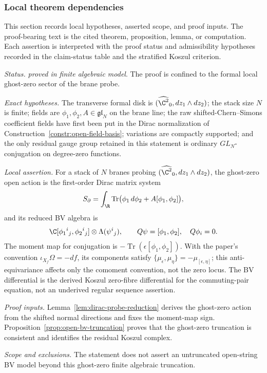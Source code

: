 \subsubsection{Local theorem dependencies}\label{ssec:theorem-lanes}
This section records local hypotheses, asserted scope, and
proof inputs.  The proof-bearing text is the cited theorem,
proposition, lemma, or computation.  Each assertion is interpreted with
the proof status and admissibility hypotheses recorded in the claim-status table
and the stratified Koszul criterion.

\begin{stmt}\label{thm:lane-dirac-probe}
  \emph{Status.} \emph{proved in finite algebraic model}.  The proof is
  confined to the formal local ghost-zero sector of the brane probe.

  \emph{Exact hypotheses.} The transverse formal disk is
  \((\widehat{\C^2}_0,dz_1\wedge dz_2)\); the stack size \(N\) is finite;
  fields are \(\phi_1,\phi_2,A\in\mathfrak{gl}_N\) on the brane line;
  the raw shifted-Chern--Simons coefficient fields have first been put in
  the Dirac normalization of
  Construction~\ref{constr:open-field-basis}; variations are compactly
  supported; and the only residual gauge group retained in this statement is
  ordinary \(GL_N\)-conjugation on degree-zero functions.

  \emph{Local assertion.} For a stack of \(N\) branes probing
  \((\widehat{\C^2}_0,dz_1\wedge dz_2)\), the ghost-zero open action is
  the first-order Dirac matrix system
  \[
    S_\partial
    =\int_\R\operatorname{Tr}
      \bigl(\phi_1\,d\phi_2+A[\phi_1,\phi_2]\bigr),
  \]
  and its reduced BV algebra is
  \[
    \C[\phi_1{}^i{}_j,\phi_2{}^i{}_j]\otimes
    \Lambda(\psi^i{}_j),
    \qquad
    Q\psi=[\phi_1,\phi_2],\quad Q\phi_i=0.
  \]
  The moment map for conjugation is
  \(-\operatorname{Tr}(\epsilon[\phi_1,\phi_2])\).  With the paper's
  convention \(\iota_{X_f}\Omega=-df\), its components satisfy
  \(\{\mu_\epsilon,\mu_\eta\}=-\mu_{[\epsilon,\eta]}\); this
  anti-equivariance affects only the comoment convention, not the zero
  locus.  The BV differential is the derived Koszul zero-fibre
  differential for the commuting-pair equation, not an underived regular
  sequence assertion.

  \emph{Proof inputs.}
  Lemma~\ref{lem:dirac-probe-reduction} derives the ghost-zero action
  from the shifted normal directions and fixes the moment-map sign.
  Proposition~\ref{prop:open-bv-truncation} proves that the ghost-zero
  truncation is consistent and identifies the residual Koszul complex.

  \emph{Scope and exclusions.} The statement does not assert an untruncated open-string
  BV model beyond this ghost-zero finite algebraic truncation.
\end{stmt}

